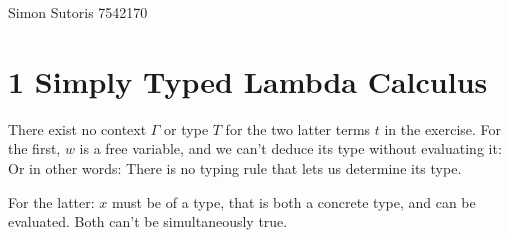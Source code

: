 \documentclass[13pt, a4paper]{article}
\begin{document}
Simon Sutoris 7542170

\section*{1 Simply Typed Lambda Calculus}

\begin{prooftree}
\end{prooftree}


\begin{prooftree}
\end{prooftree}

There exist no context $\Gamma$ or type $T$ for the two latter terms $t$ in the exercise. For the first, $w$ is a free variable, and we can't deduce its type without evaluating it: Or in other words: There is no typing rule that lets us determine its type.

For the latter: $x$ must be of a type, that is both a concrete type, and can be evaluated. Both can't be simultaneously true.
\end{document}
